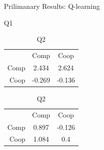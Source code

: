 \documentclass{beamer}
\begin{document}
\begin{frame}{Prilimanary Results: Q-learning}
    \begin{table}[!htb]
        \begin{minipage}{.5\linewidth}
          \caption{Q1}
          \centering
            \begin{tabular}{ r|c|c| }
                \multicolumn{1}{r}{}
                 &  \multicolumn{1}{c}{Comp}
                 & \multicolumn{1}{c}{Coop} \\
                \cline{2-3}
                Comp & 2.434 & 2.624 \\
                \cline{2-3}
                Coop & -0.269 & -0.136 \\
                \cline{2-3}
            \end{tabular}
        \end{minipage}%
        \begin{minipage}{.5\linewidth}
          \centering
            \caption{Q2}
            \begin{tabular}{ r|c|c| }
                \multicolumn{1}{r}{}
                 &  \multicolumn{1}{c}{Comp}
                 & \multicolumn{1}{c}{Coop} \\
                \cline{2-3}
                Comp & 0.897 & -0.126 \\
                \cline{2-3}
                Coop & 1.084 & 0.4 \\
                \cline{2-3}
            \end{tabular}
        \end{minipage}
    \end{table}


\end{frame}
\end{document}
